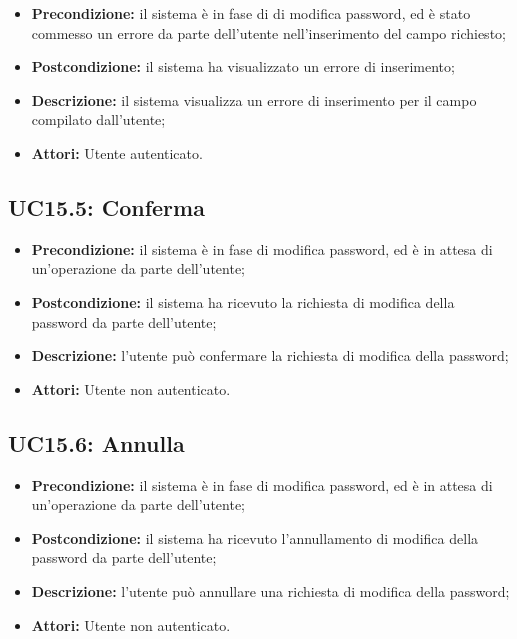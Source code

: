 \begin{itemize}
	\item \textbf{Precondizione:} il sistema è in fase di di modifica password, ed è stato commesso un errore da parte dell'utente nell'inserimento del campo richiesto;
	\item \textbf{Postcondizione:} il sistema ha visualizzato un errore di inserimento;
	\item \textbf{Descrizione:} il sistema visualizza un errore di inserimento per il campo compilato dall'utente;
	\item \textbf{Attori:} Utente autenticato.
\end{itemize}

\subsection{ UC15.5: Conferma}

\begin{itemize}
	\item \textbf{Precondizione:} il sistema è in fase di modifica password, ed è in attesa di un'operazione da parte dell'utente;
	\item \textbf{Postcondizione:} il sistema ha ricevuto la richiesta di modifica della password da parte dell'utente;
	\item \textbf{Descrizione:} l'utente può confermare la richiesta di modifica della password;
	\item \textbf{Attori:} Utente non autenticato.
\end{itemize}
\subsection{ UC15.6: Annulla}

\begin{itemize}
	\item \textbf{Precondizione:} il sistema è in fase di modifica password, ed è in attesa di un'operazione da parte dell'utente;
	\item \textbf{Postcondizione:} il sistema ha ricevuto l'annullamento di modifica della password da parte dell'utente;
	\item \textbf{Descrizione:} l'utente può annullare una richiesta di modifica della password;
	\item \textbf{Attori:} Utente non autenticato.
\end{itemize}
